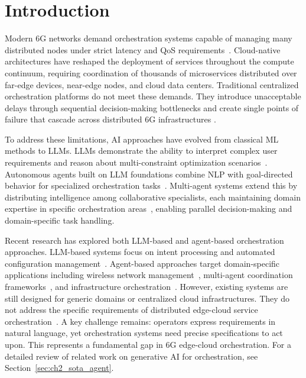 \section{Introduction}
\label{sec:ch5_introduction}

Modern \ac{6G} networks demand orchestration systems capable of managing many distributed nodes under strict latency and \ac{QoS} requirements~\cite{6g_roaming, intent_driven_ran2021}. Cloud-native architectures have reshaped the deployment of services throughout the compute continuum, requiring coordination of thousands of microservices distributed over far-edge devices, near-edge nodes, and cloud data centers. Traditional centralized orchestration platforms do not meet these demands. They introduce unacceptable delays through sequential decision-making bottlenecks and create single points of failure that cascade across distributed \ac{6G} infrastructures \cite{6g_struggles_orchestration2025}.\par

To address these limitations, \ac{AI} approaches have evolved from classical \ac{ML} methods to \acp{LLM}. \acp{LLM} demonstrate the ability to interpret complex user requirements and reason about multi-constraint optimization scenarios~\cite{kim2025kubeteus, netllm2024}. Autonomous agents built on \ac{LLM} foundations combine \ac{NLP} with goal-directed behavior for specialized orchestration tasks~\cite{yao2023react}. Multi-agent systems extend this by distributing intelligence among collaborative specialists, each maintaining domain expertise in specific orchestration areas~\cite{6g_roaming, intent_6g2024}, enabling parallel decision-making and domain-specific task handling.

Recent research has explored both \ac{LLM}-based and agent-based orchestration approaches. \ac{LLM}-based systems focus on intent processing and automated configuration management~\cite{intent_driven_ran2021, LLMIntentServiceConfig2024, EnhancingNetworkManagementMSR2023}. Agent-based approaches target domain-specific applications including wireless network management~\cite{WirelessAgentLLM2025, LLMAgentsProactiveFaultTolerant2024}, multi-agent coordination frameworks~\cite{HermesLLMFramework2024, MaestroLLMCollaborative2024, xiao2025agentnet}, and infrastructure orchestration~\cite{DataConnectorAgentFramework2024, service_orch_2025}. However, existing systems are still designed for generic domains or centralized cloud infrastructures. They do not address the specific requirements of distributed edge-cloud service orchestration~\cite{RadioMapAgentsNetworkPlanning2025}. A key challenge remains: operators express requirements in natural language, yet orchestration systems need precise specifications to act upon. This represents a fundamental gap in 6G edge-cloud orchestration. For a detailed review of related work on generative AI for orchestration, see Section~\ref{sec:ch2_sota_agent}.

